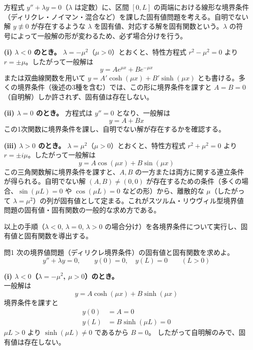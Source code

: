 \documentclass[a4paper,11pt]{article}
\begin{document}


\noindent
方程式 $y'' + \lambda y = 0$（$\lambda$ は定数）に、区間 $[0, L]$ の両端における線形な境界条件（ディリクレ・ノイマン・混合など）を課した固有値問題を考える。自明でない解 $y \not\equiv 0$ が存在するような $\lambda$ を固有値、対応する解を固有関数という。$\lambda$ の符号によって一般解の形が変わるため、必ず場合分けを行う。

\medskip
\noindent
\textbf{(i) $\lambda < 0$ のとき。} $\lambda = -\mu^{2}$（$\mu > 0$）とおくと、特性方程式 $r^{2} - \mu^{2} = 0$ より $r = \pm\mu$。したがって一般解は
\[
y = A e^{\mu x} + B e^{-\mu x}
\]
または双曲線関数を用いて $y = A'\cosh(\mu x) + B'\sinh(\mu x)$ とも書ける。多くの境界条件（後述の3種を含む）では、この形に境界条件を課すと $A = B = 0$（自明解）しか許されず、固有値は存在しない。

\medskip
\noindent
\textbf{(ii) $\lambda = 0$ のとき。} 方程式は $y'' = 0$ となり、一般解は
\[
y = A + Bx
\]
この1次関数に境界条件を課し、自明でない解が存在するかを確認する。

\medskip
\noindent
\textbf{(iii) $\lambda > 0$ のとき。} $\lambda = \mu^{2}$（$\mu > 0$）とおくと、特性方程式 $r^{2} + \mu^{2} = 0$ より $r = \pm i\mu$。したがって一般解は
\[
y = A\cos(\mu x) + B\sin(\mu x)
\]
この三角関数解に境界条件を課すと、$A, B$ の一方または両方に関する連立条件が得られる。自明でない解 $(A, B) \neq (0,0)$ が存在するための条件（多くの場合、$\sin(\mu L) = 0$ や $\cos(\mu L) = 0$ などの形）から、離散的な $\mu$（したがって $\lambda = \mu^{2}$）の列が固有値として定まる。これがスツルム・リウヴィル型境界値問題の固有値・固有関数の一般的な求め方である。

\medskip
\noindent
以上の手順（$\lambda < 0$, $\lambda = 0$, $\lambda > 0$ の場合分け）を各境界条件について実行し、固有値と固有関数を導出する。

\clearpage
\begin{mondaiboxS}{問1}
次の境界値問題（ディリクレ境界条件）の固有値と固有関数を求めよ。
\[
y'' + \lambda y = 0, \qquad y(0) = 0, \quad y(L) = 0 \qquad (L > 0)
\]
\end{mondaiboxS}
\kaitou

\textbf{(i) $\lambda < 0$（$\lambda = -\mu^{2}$, $\mu>0$）のとき。}\\
一般解は
\[
y = A\cosh(\mu x) + B\sinh(\mu x)
\]
境界条件を課すと
\begin{align*}
y(0) &= A = 0 \\
y(L) &= B\sinh(\mu L) = 0
\end{align*}
$\mu L > 0$ より $\sinh(\mu L) \neq 0$ であるから $B = 0$。
したがって自明解のみで、固有値は存在しない。
\end{document}
